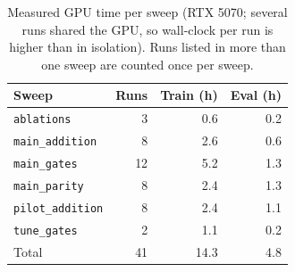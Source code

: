 \begin{table}[h]
\centering
\caption{Measured GPU time per sweep (RTX 5070; several runs shared the GPU, so wall-clock per run is higher than in isolation). Runs listed in more than one sweep are counted once per sweep.}
\label{tab:compute}
\small
\begin{tabular}{lrrr}
\toprule
Sweep & Runs & Train (h) & Eval (h) \\
\midrule
\texttt{ablations} & 3 & 0.6 & 0.2 \\
\texttt{main\_addition} & 8 & 2.6 & 0.6 \\
\texttt{main\_gates} & 12 & 5.2 & 1.3 \\
\texttt{main\_parity} & 8 & 2.4 & 1.3 \\
\texttt{pilot\_addition} & 8 & 2.4 & 1.1 \\
\texttt{tune\_gates} & 2 & 1.1 & 0.2 \\
\midrule
Total & 41 & 14.3 & 4.8 \\
\bottomrule
\end{tabular}
\end{table}